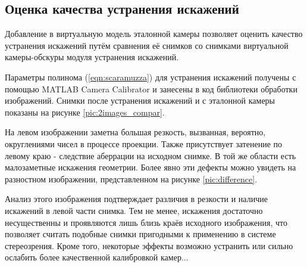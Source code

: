 
\subsection{Оценка качества устранения искажений}

Добавление в виртуальную модель эталонной камеры позволяет оценить качество устранения искажений путём сравнения
её снимков со снимками виртуальной камеры-обскуры модуля устранения искажений. %

Параметры полинома (\ref{eqn:scaramuzza}) для устранения искажений получены с помощью MATLAB Camera Calibrator и занесены 
в код библиотеки обработки изображений. %
Снимки после устранения искажений и с эталонной камеры показаны на рисунке \ref{pic:2images_compar}.

На левом изображении заметна большая резкость, вызванная, вероятно, округлениями чисел в процессе проекции. Также присутствует 
затенение по левому краю - следствие аберрации на исходном снимке. В той же области есть малозаметные искажения геометрии. Более 
явно эти дефекты можно увидеть на разностном изображении, представленном на рисунке \ref{pic:difference}. 


Анализ этого изображения подтверждает различия в резкости и наличие искажений в левой части снимка. Тем не менее, искажения
достаточно несущественны и проявляются лишь близь краёв исходного изображения, что позволяет считать подобные снимки пригодными 
к применению в системе стереозрения.  Кроме того, некоторые эффекты возможно устранить или  сильно ослабить более качественной 
калибровкой камер... %
